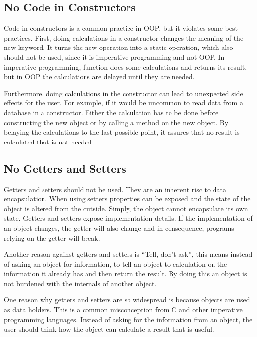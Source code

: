 \subsection{No Code in Constructors}\label{subsec:no-code-in-constructors}
Code in constructors is a common practice in \gls{OOP}, but it violates some best practices.
First, doing calculations in a constructor changes the meaning of the new keyword.
It turns the new operation into a static operation, which also should not be used, since it is imperative programming and not \gls{OOP}.
In imperative programming, function does some calculations and returns its result, but in \gls{OOP} the calculations are delayed until they are needed.

Furthermore, doing calculations in the constructor can lead to unexpected side effects for the user.
For example, if it would be uncommon to read data from a database in a constructor.
Either the calculation has to be done before constructing the new object or by calling a method on the new object.
By belaying the calculations to the last possible point, it assures that no result is calculated that is not needed.


\subsection{No Getters and Setters}\label{subsec:no-getters-and-setters}
Getters and setters should not be used.
They are an inherent risc to data encapsulation.
When using setters properties can be exposed and the state of the object is altered from the outside.
Simply, the object cannot encapsulate its own state.\cite{encapsulation}
Getters and setters expose implementation details.
If the implementation of an object changes, the getter will also change and in consequence, programs relying on the getter will break.

Another reason against getters and setters is ``Tell, don't ask'', this means instead of asking an object for information, to tell an object to calculation on the information it already has and then return the result.
By doing this an object is not burdened with the internals of another object.\cite{tell-dont-ask}

One reason why getters and setters are so widespread is because objects are used as data holders.
This is a common misconception from C and other imperative programming languages.
Instead of asking for the information from an object, the user should think how the object can calculate a result that is useful.

